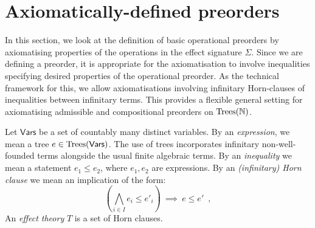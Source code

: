 \documentclass[a4paper,UKenglish]{lipics-v2018}
\newcommand{\Trees}{\textnormal{Trees}}
\newcommand{\Vars}{\mathsf{Vars}}
\theoremstyle{plain}
\begin{document}
\section{Axiomatically-defined preorders}
\label{section:axiomatic}

In this section, we look at the definition of basic operational preorders by axiomatising
properties of the operations in the effect signature $\Sigma$.
Since we are defining a preorder, it is appropriate for the axiomatisation to involve inequalities
specifying desired properties of the operational preorder. As the technical framework for this, we allow
axiomatisations involving infinitary Horn-clauses of inequalities between infinitary terms.  This provides a flexible general setting for
axiomatising admissible and compositional preorders on 
$\Trees(\mathbb{N})$. 

Let $\Vars$ be a set of countably many distinct variables. By an  \emph{expression}, we mean a
tree $e \in \Trees(\Vars)$. The use of trees incorporates infinitary non-well-founded terms alongside the usual finite
algebraic terms. By an \emph{inequality} we mean a statement $e_1 \leq e_2$, where $e_1, e_2$ are expressions.
By an \emph{(infinitary) Horn clause} we mean an implication of the form:
\begin{equation}
\label{equation:horn-clause}
\left( \bigwedge_{i \in I} e_i \leq e'_i \right)~ \implies ~ e \leq e' \enspace ,
\end{equation}
An \emph{effect theory} $T$  is a set of Horn clauses.
\end{document}
